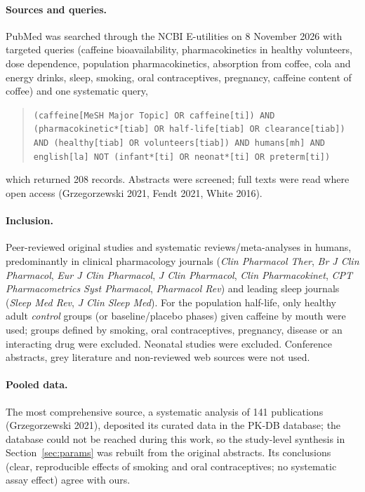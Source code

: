 \documentclass[10pt,a4paper]{article}
\begin{document}
\paragraph{Sources and queries.} PubMed was searched through the NCBI E-utilities on 8 November 2026 with
targeted queries (caffeine bioavailability, pharmacokinetics in healthy volunteers, dose dependence,
population pharmacokinetics, absorption from coffee, cola and energy drinks, sleep, smoking,
oral contraceptives, pregnancy, caffeine content of coffee) and one systematic query,
\begin{quote}\small
\texttt{(caffeine[MeSH Major Topic] OR caffeine[ti]) AND (pharmacokinetic*[tiab] OR half-life[tiab] OR
clearance[tiab]) AND (healthy[tiab] OR volunteers[tiab]) AND humans[mh] AND english[la] NOT
(infant*[ti] OR neonat*[ti] OR preterm[ti])}
\end{quote}
which returned 208 records. Abstracts were screened; full texts were read where open access
(Grzegorzewski 2021, Fendt 2021, White 2016).

\paragraph{Inclusion.} Peer-reviewed original studies and systematic reviews/meta-analyses in humans,
predominantly in clinical pharmacology journals (\emph{Clin Pharmacol Ther}, \emph{Br J Clin Pharmacol},
\emph{Eur J Clin Pharmacol}, \emph{J Clin Pharmacol}, \emph{Clin Pharmacokinet}, \emph{CPT Pharmacometrics
Syst Pharmacol}, \emph{Pharmacol Rev}) and leading sleep journals (\emph{Sleep Med Rev}, \emph{J Clin Sleep Med}).
For the population half-life, only healthy adult \emph{control} groups (or baseline/placebo phases)
given caffeine by mouth were used; groups defined by smoking, oral contraceptives, pregnancy, disease or
an interacting drug were excluded. Neonatal studies were excluded. Conference abstracts, grey literature
and non-reviewed web sources were not used.

\paragraph{Pooled data.} The most comprehensive source, a systematic analysis of 141 publications
(Grzegorzewski 2021), deposited its curated data in the PK-DB database; the database could not be reached
during this work, so the study-level synthesis in Section~\ref{sec:params} was rebuilt from the original
abstracts. Its conclusions (clear, reproducible effects of smoking and oral contraceptives; no systematic
assay effect) agree with ours.
\end{document}
